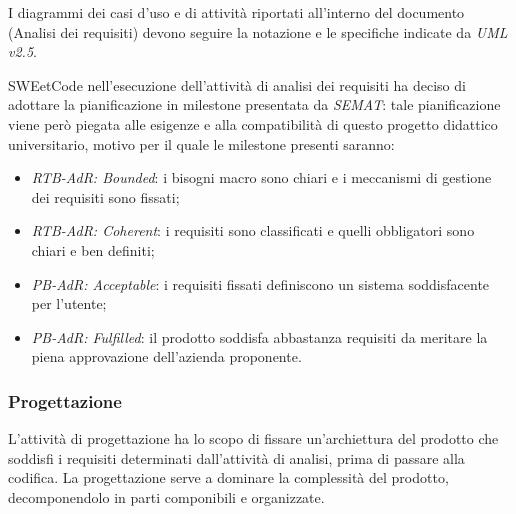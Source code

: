 \documentclass[10pt, a4paper]{article}
\begin{document}
I diagrammi dei casi d'uso e di attività riportati all'interno del documento (Analisi dei requisiti) devono seguire la notazione e le specifiche indicate da \textit{UML v2.5}.

SWEetCode nell'esecuzione dell'attività di analisi dei requisiti ha deciso di adottare la pianificazione in milestone presentata 
da \textit{SEMAT}: tale pianificazione viene però piegata alle esigenze e alla compatibilità di questo progetto didattico universitario, motivo
per il quale le milestone presenti saranno:
\begin{itemize}
    \item \textit{RTB-AdR: Bounded}: i bisogni macro sono chiari e i meccanismi di gestione dei requisiti sono fissati;
    \item \textit{RTB-AdR: Coherent}: i requisiti sono classificati e quelli obbligatori sono chiari e ben definiti;
    \item \textit{PB-AdR: Acceptable}: i requisiti fissati definiscono un sistema soddisfacente per l'utente;
    \item \textit{PB-AdR: Fulfilled}: il prodotto soddisfa abbastanza requisiti da meritare la piena approvazione dell'azienda proponente. 
\end{itemize}

\subsubsection{Progettazione}
L'attività di progettazione ha lo scopo di fissare un'archiettura del prodotto che soddisfi i requisiti determinati dall'attività di analisi, prima di passare alla codifica.
La progettazione serve a dominare la complessità del prodotto, decomponendolo in parti componibili e organizzate.
\end{document}
